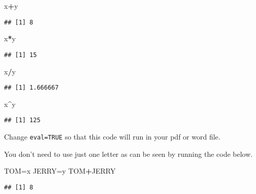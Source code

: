 \documentclass[]{article}
\newenvironment{Shaded}{\begin{snugshade}}{\end{snugshade}}
\newcommand{\NormalTok}[1]{#1}
\newcommand{\OperatorTok}[1]{\textcolor[rgb]{0.81,0.36,0.00}{\textbf{#1}}}
\begin{document}
\begin{Shaded}
\begin{Highlighting}[]
\NormalTok{x}\OperatorTok{+}\NormalTok{y}
\end{Highlighting}
\end{Shaded}

\begin{verbatim}
## [1] 8
\end{verbatim}

\begin{Shaded}
\begin{Highlighting}[]
\NormalTok{x}\OperatorTok{*}\NormalTok{y}
\end{Highlighting}
\end{Shaded}

\begin{verbatim}
## [1] 15
\end{verbatim}

\begin{Shaded}
\begin{Highlighting}[]
\NormalTok{x}\OperatorTok{/}\NormalTok{y}
\end{Highlighting}
\end{Shaded}

\begin{verbatim}
## [1] 1.666667
\end{verbatim}

\begin{Shaded}
\begin{Highlighting}[]
\NormalTok{x}\OperatorTok{^}\NormalTok{y}
\end{Highlighting}
\end{Shaded}

\begin{verbatim}
## [1] 125
\end{verbatim}

Change \texttt{eval=TRUE} so that this code will run in your pdf or word
file.

You don't need to use just one letter as can be seen by running the code
below.

\begin{Shaded}
\begin{Highlighting}[]
\NormalTok{TOM=x}
\NormalTok{JERRY=y}
\NormalTok{TOM}\OperatorTok{+}\NormalTok{JERRY}
\end{Highlighting}
\end{Shaded}

\begin{verbatim}
## [1] 8
\end{verbatim}
\end{document}
